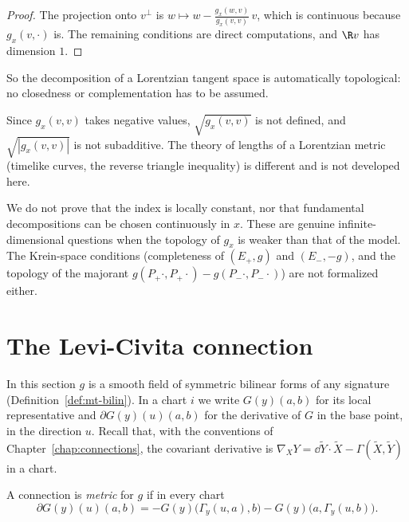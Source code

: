 \begin{proof}
  \leanok
  The projection onto $v^\perp$ is $w \mapsto w - \frac{g_x(w, v)}{g_x(v, v)}\, v$, which is
  continuous because $g_x(v, \cdot)$ is. The remaining conditions are direct computations, and
  $\R v$ has dimension $1$.
\end{proof}

So the decomposition of a Lorentzian tangent space is automatically topological: no closedness or
complementation has to be assumed.

\begin{remark}
  Since $g_x(v,v)$ takes negative values, $\sqrt{g_x(v,v)}$ is not defined, and $\sqrt{|g_x(v,v)|}$
  is not subadditive. The theory of lengths of a Lorentzian metric (timelike curves, the reverse
  triangle inequality) is different and is not developed here.
\end{remark}

\begin{remark}
  We do not prove that the index is locally constant, nor that fundamental decompositions can be
  chosen continuously in $x$. These are genuine infinite-dimensional questions when the topology
  of $g_x$ is weaker than that of the model. The Krein-space conditions (completeness of
  $(E_+, g)$ and $(E_-, -g)$, and the topology of the majorant $g(P_+\cdot, P_+\cdot) - g(P_-\cdot,
  P_-\cdot)$) are not formalized either.
\end{remark}

\section{The Levi-Civita connection}
\label{sec:mt-levi-civita}

In this section $g$ is a smooth field of symmetric bilinear forms of any signature
(Definition~\ref{def:mt-bilin}). In a chart $i$ we write $G(y)(a, b)$ for its local representative
and $\partial G(y)(u)(a, b)$ for the derivative of $G$ in the base point, in the direction $u$.
Recall that, with the conventions of Chapter~\ref{chap:connections}, the covariant derivative is
$\nabla_X Y = \dd \tilde Y \cdot \tilde X - \Gamma(\tilde X, \tilde Y)$ in a chart.

\begin{definition}
  \label{def:mt-metric-connection}
  \leanok
  A connection is \emph{metric} for $g$ if in every chart
  \[
    \partial G(y)(u)(a, b) = -G(y)\bigl(\Gamma_y(u, a), b\bigr) - G(y)\bigl(a, \Gamma_y(u, b)\bigr).
  \]
\end{definition}

